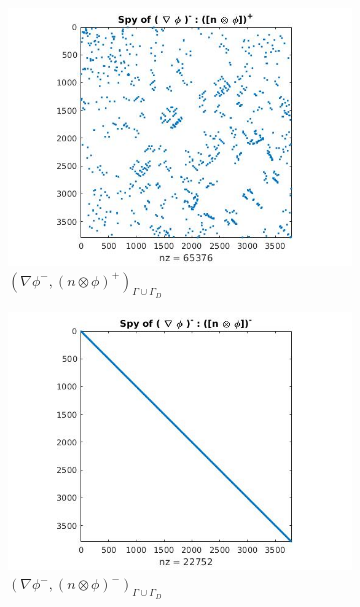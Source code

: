 \documentclass[a4paper,twoside,openright]{book}
\begin{document}
\begin{figure}
\begin{subfigure}{0.5\textwidth}
    \includegraphics[width=\linewidth]{figure33.jpg}
  \caption{$( \nabla \phi^- ,(n \otimes \phi)^+)_{\Gamma \cup \Gamma_D}$}
  \label{fig:figure33}
  \end{subfigure}
    \begin{subfigure}{0.5\textwidth}
    \includegraphics[width=\linewidth]{figure34.jpg}
  \caption{$( \nabla \phi^- ,(n \otimes \phi)^-)_{\Gamma \cup \Gamma_D}$}
  \label{fig:figure34}
  \end{subfigure}
  \begin{subfigure}{\textwidth}	
\centering

\end{subfigure}
\end{figure}
\end{document}
